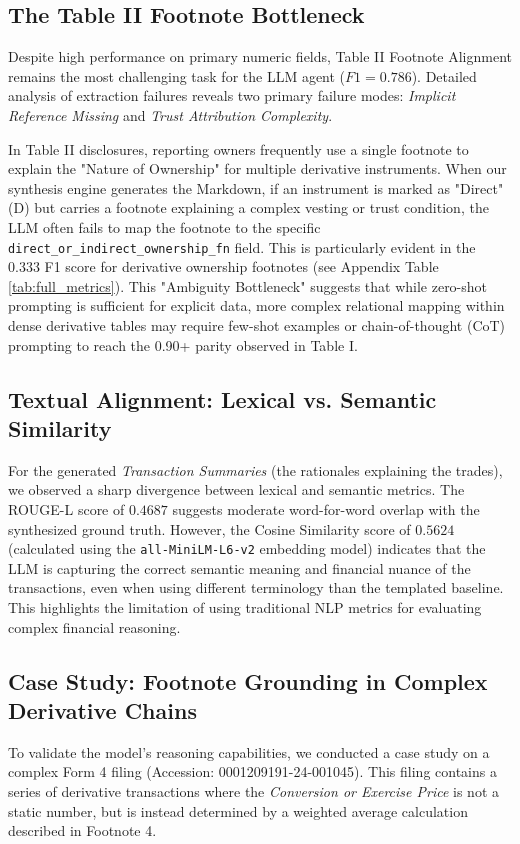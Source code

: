 \documentclass[journal, onecolumn]{IEEEtran}
\begin{document}
\subsection{The Table II Footnote Bottleneck}
Despite high performance on primary numeric fields, Table II Footnote Alignment remains the most challenging task for the LLM agent ($F1=0.786$). Detailed analysis of extraction failures reveals two primary failure modes: \textit{Implicit Reference Missing} and \textit{Trust Attribution Complexity}. 

In Table II disclosures, reporting owners frequently use a single footnote to explain the "Nature of Ownership" for multiple derivative instruments. When our synthesis engine generates the Markdown, if an instrument is marked as "Direct" (D) but carries a footnote explaining a complex vesting or trust condition, the LLM often fails to map the footnote to the specific \texttt{direct\_or\_indirect\_ownership\_fn} field. This is particularly evident in the 0.333 F1 score for derivative ownership footnotes (see Appendix Table \ref{tab:full_metrics}). This "Ambiguity Bottleneck" suggests that while zero-shot prompting is sufficient for explicit data, more complex relational mapping within dense derivative tables may require few-shot examples or chain-of-thought (CoT) prompting to reach the 0.90+ parity observed in Table I.

\subsection{Textual Alignment: Lexical vs. Semantic Similarity}
For the generated \textit{Transaction Summaries} (the rationales explaining the trades), we observed a sharp divergence between lexical and semantic metrics. The ROUGE-L score of $0.4687$ suggests moderate word-for-word overlap with the synthesized ground truth. However, the Cosine Similarity score of $0.5624$ (calculated using the \texttt{all-MiniLM-L6-v2} embedding model) indicates that the LLM is capturing the correct semantic meaning and financial nuance of the transactions, even when using different terminology than the templated baseline. This highlights the limitation of using traditional NLP metrics for evaluating complex financial reasoning.

\subsection{Case Study: Footnote Grounding in Complex Derivative Chains}
To validate the model's reasoning capabilities, we conducted a case study on a complex Form 4 filing (Accession: 0001209191-24-001045). This filing contains a series of derivative transactions where the \textit{Conversion or Exercise Price} is not a static number, but is instead determined by a weighted average calculation described in Footnote 4. 
\end{document}
